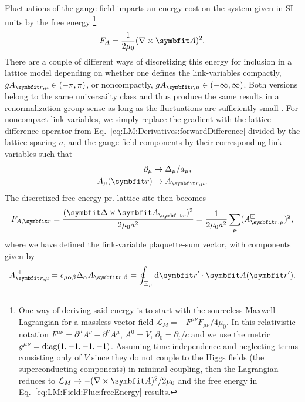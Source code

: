 Fluctuations of the gauge field imparts an energy cost on the system given in SI-units by the free energy%
\footnote{One way of deriving said energy is to start with the sourceless
Maxwell Lagrangian for a massless vector field
$\mathcal{L}_M = -F^{\mu\nu}F_{\mu\nu}/4\mu_0$. In this relativistic notation $F^{\mu\nu} = \partial^\mu A^\nu-\partial^\nu A^\mu$, $A^0 = V$, $\partial_0 = \partial_t/c$ and we use  the
metric $g^{\mu\nu} = \operatorname{diag}(1, -1, -1, -1)$. Assuming time-independence and neglecting terms consisting only of $V$ since they do not couple to the Higgs fields (\eg the superconducting
components) in minimal coupling, then the Lagrangian reduces to $\mathcal{L}_M \to -(\nabla\times\v{A})^2/2\mu_0$ and the free energy in Eq.~\eqref{eq:LM:Field:Fluc:freeEnergy} results.}
\begin{equation}
    \label{eq:LM:Field:Fluc:freeEnergy}
    F_A = \frac{1}{2\mu_0}(\nabla\times\v{A})^2.
\end{equation}
There are a couple of different ways of discretizing this energy for inclusion in a lattice model depending on whether one defines the link-variables compactly,
\ie $gA_{\v{r},\mu} \in (-\pi, \pi)$, or noncompactly, \ie $gA_{\v{r},\mu} \in (-\infty,\infty)$. Both versions belong to the same universailty class and thus produce the same
results in a renormalization group sense as long as the fluctuations are sufficiently small \cite{shimizu12}. For noncompact link-variables, we simply replace the gradient with the
lattice difference operator from Eq.~\eqref{eq:LM:Derivatives:forwardDifference} divided by the lattice spacing $a$, 
and the gauge-field components by their corresponding link-variables such that
\begin{equation}
    \label{eq:LM:Field:Fluc:discretization}
    \begin{split}
        \partial_\mu &\mapsto \Delta_\mu/a_\mu,\\
        A_\mu(\v{r}) &\mapsto A_{\v{r},\mu}.
    \end{split}
\end{equation}
The discretized free energy pr. lattice site then becomes
\begin{equation}
    \label{eq:LM:Field:Fluc:discretizedFreeEnergy}
    F_{A,\v{r}} = \frac{(\v{\Delta}\times\v{A}_\v{r})^2}{2\mu_0a^2} = \frac{1}{2\mu_0a^2}\sum_\mu(A^\boxdot_{\v{r},\mu})^2,
\end{equation}
where we have defined the link-variable plaquette-sum vector, with components given by
\begin{equation}
    \label{eq:LM:Field:Fluc:plaquetteSum}
    A^\boxdot_{\v{r},\mu} = \epsilon_{\mu\alpha\beta}\Delta_\alpha A_{\v{r},\beta} = \oint_{\boxdot_\mu} \mathrm{d}\v{r}'\cdot\v{A}(\v{r}').
\end{equation}
